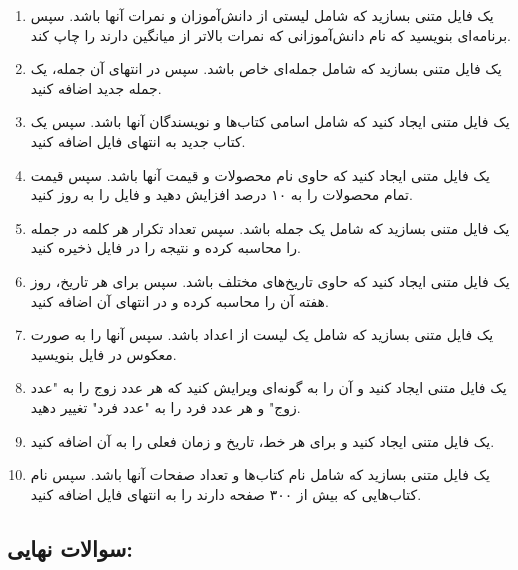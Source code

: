\documentclass[a4paper,12pt]{article}
\begin{document}
	\begin{enumerate}
		\item یک فایل متنی بسازید که شامل لیستی از دانش‌آموزان و نمرات آنها باشد. سپس برنامه‌ای بنویسید که نام دانش‌آموزانی که نمرات بالاتر از میانگین دارند را چاپ کند.
		\item یک فایل متنی بسازید که شامل جمله‌ای خاص باشد. سپس در انتهای آن جمله، یک جمله جدید اضافه کنید.
		\item یک فایل متنی ایجاد کنید که شامل اسامی کتاب‌ها و نویسندگان آنها باشد. سپس یک کتاب جدید به انتهای فایل اضافه کنید.
		\item یک فایل متنی ایجاد کنید که حاوی نام محصولات و قیمت آنها باشد. سپس قیمت تمام محصولات را به ۱۰ درصد افزایش دهید و فایل را به روز کنید.
		\item یک فایل متنی بسازید که شامل یک جمله باشد. سپس تعداد تکرار هر کلمه در جمله را محاسبه کرده و نتیجه را در فایل ذخیره کنید.
		\item یک فایل متنی ایجاد کنید که حاوی تاریخ‌های مختلف باشد. سپس برای هر تاریخ، روز هفته آن را محاسبه کرده و در انتهای آن اضافه کنید.
		\item یک فایل متنی بسازید که شامل یک لیست از اعداد باشد. سپس آنها را به صورت معکوس در فایل بنویسید.
		\item یک فایل متنی ایجاد کنید و آن را به گونه‌ای ویرایش کنید که هر عدد زوج را به "عدد زوج" و هر عدد فرد را به "عدد فرد" تغییر دهید.
		\item یک فایل متنی ایجاد کنید و برای هر خط، تاریخ و زمان فعلی را به آن اضافه کنید.
		\item یک فایل متنی بسازید که شامل نام کتاب‌ها و تعداد صفحات آنها باشد. سپس نام کتاب‌هایی که بیش از ۳۰۰ صفحه دارند را به انتهای فایل اضافه کنید.
	\end{enumerate}
	
	\subsection*{سوالات نهایی:}
	
\end{document}
